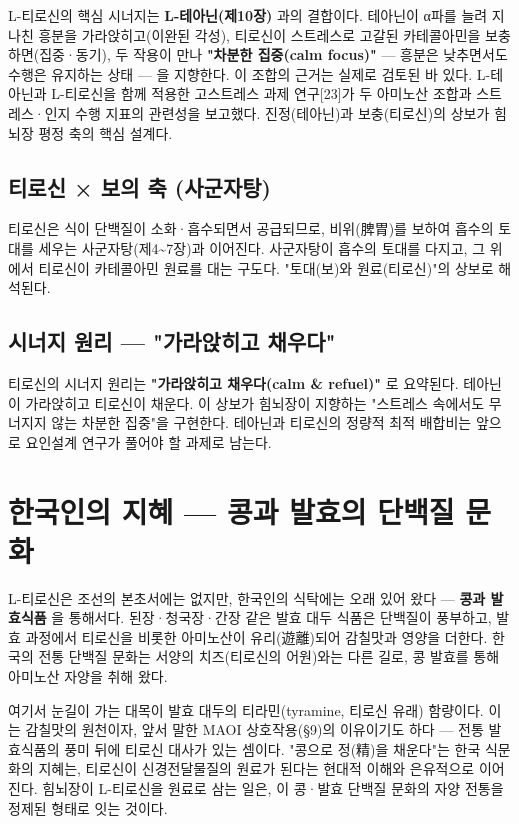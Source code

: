 \documentclass[12pt,oneside]{book}
\begin{document}
L-티로신의 핵심 시너지는 \textbf{L-테아닌(제10장)} 과의 결합이다. 테아닌이 α파를 늘려 지나친 흥분을 가라앉히고(이완된 각성), 티로신이 스트레스로 고갈된 카테콜아민을 보충하면(집중·동기), 두 작용이 만나 \textbf{"차분한 집중(calm focus)"} — 흥분은 낮추면서도 수행은 유지하는 상태 — 을 지향한다. 이 조합의 근거는 실제로 검토된 바 있다. L-테아닌과 L-티로신을 함께 적용한 고스트레스 과제 연구[23]가 두 아미노산 조합과 스트레스·인지 수행 지표의 관련성을 보고했다. 진정(테아닌)과 보충(티로신)의 상보가 힘뇌장 평정 축의 핵심 설계다.

\subsection{티로신 × 보의 축 (사군자탕)}

티로신은 식이 단백질이 소화·흡수되면서 공급되므로, 비위(脾胃)를 보하여 흡수의 토대를 세우는 사군자탕(제4\textasciitilde{}7장)과 이어진다. 사군자탕이 흡수의 토대를 다지고, 그 위에서 티로신이 카테콜아민 원료를 대는 구도다. "토대(보)와 원료(티로신)"의 상보로 해석된다.

\subsection{시너지 원리 — "가라앉히고 채우다"}

티로신의 시너지 원리는 \textbf{"가라앉히고 채우다(calm \& refuel)"} 로 요약된다. 테아닌이 가라앉히고 티로신이 채운다. 이 상보가 힘뇌장이 지향하는 "스트레스 속에서도 무너지지 않는 차분한 집중"을 구현한다. 테아닌과 티로신의 정량적 최적 배합비는 앞으로 요인설계 연구가 풀어야 할 과제로 남는다.

\section{한국인의 지혜 — 콩과 발효의 단백질 문화}

L-티로신은 조선의 본초서에는 없지만, 한국인의 식탁에는 오래 있어 왔다 — \textbf{콩과 발효식품} 을 통해서다. 된장·청국장·간장 같은 발효 대두 식품은 단백질이 풍부하고, 발효 과정에서 티로신을 비롯한 아미노산이 유리(遊離)되어 감칠맛과 영양을 더한다. 한국의 전통 단백질 문화는 서양의 치즈(티로신의 어원)와는 다른 길로, 콩 발효를 통해 아미노산 자양을 취해 왔다.

여기서 눈길이 가는 대목이 발효 대두의 티라민(tyramine, 티로신 유래) 함량이다. 이는 감칠맛의 원천이자, 앞서 말한 MAOI 상호작용(§9)의 이유이기도 하다 — 전통 발효식품의 풍미 뒤에 티로신 대사가 있는 셈이다. "콩으로 정(精)을 채운다"는 한국 식문화의 지혜는, 티로신이 신경전달물질의 원료가 된다는 현대적 이해와 은유적으로 이어진다. 힘뇌장이 L-티로신을 원료로 삼는 일은, 이 콩·발효 단백질 문화의 자양 전통을 정제된 형태로 잇는 것이다.
\end{document}
